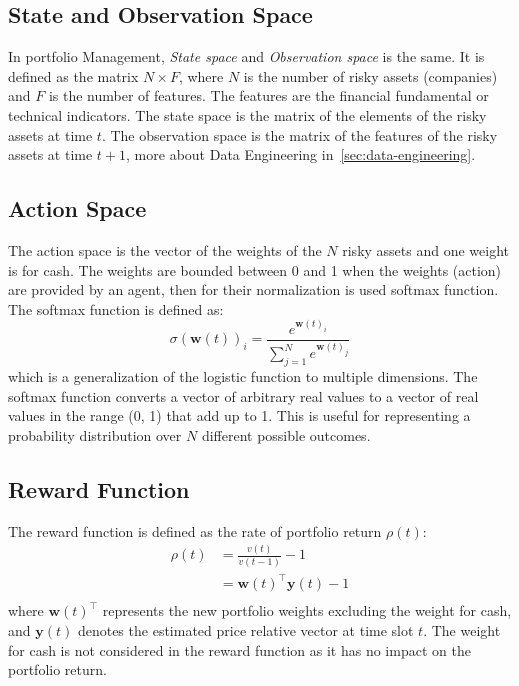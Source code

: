\documentclass[../xlapes02]{subfiles}
\begin{document}
    \subsection{State and Observation Space}\label{subsec:state-space}
    In portfolio Management, \emph{State space} and \emph{Observation space} is the same. It is defined as the matrix $N\times F$, where $N$ is the number of risky assets (companies) and $F$ is the number of features. The features are the financial fundamental or technical indicators. The state space is the matrix of the elements of the risky assets at time $t$. The observation space is the matrix of the features of the risky assets at time $t+1$, more about Data Engineering in~\cref{sec:data-engineering}.

    \subsection{Action Space}\label{subsec:action-space}
    The action space is the vector of the weights of the $N$ risky assets and one weight is for cash. The weights are bounded between 0 and 1 when the weights (action) are provided by an agent, then for their normalization is used softmax function. The softmax function is defined as:
    \begin{equation}
        \sigma(\bm{w}(t))_i=\frac{e^{\bm{w}(t)_i}}{\sum_{j=1}^{N}e^{\bm{w}(t)_j}}\label{eq:equation}
    \end{equation}
    which is a generalization of the logistic function to multiple dimensions. The softmax function converts a vector of arbitrary real values to a vector of real values in the range (0, 1) that add up to 1. This is useful for representing a probability distribution over $N$ different possible outcomes.

    \subsection{Reward Function}\label{subsec:reward-function}
    The reward function is defined as the rate of portfolio return $\rho(t)$:
    \begin{equation}
        \begin{split}
            \rho(t)&=\frac{v(t)}{v(t-1)}-1\\
            &=\mathbf{w}(t)^\top\mathbf{y}(t)-1\\
        \end{split}\label{eq:equation}
    \end{equation}
    where $\mathbf{w}(t)^\top$ represents the new portfolio weights excluding the weight for cash, and $\mathbf{y}(t)$ denotes the estimated price relative vector at time slot $t$. The weight for cash is not considered in the reward function as it has no impact on the portfolio return.
\end{document}
